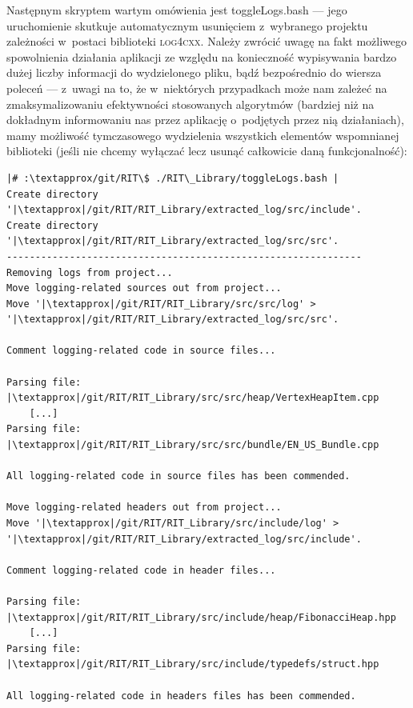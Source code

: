 Następnym skryptem wartym omówienia jest \textsf{toggleLogs.bash} --- jego uruchomienie skutkuje automatycznym usunięciem z~wybranego projektu zależności w~postaci biblioteki \textsc{log4cxx}. Należy zwrócić uwagę na fakt możliwego spowolnienia działania aplikacji ze względu na konieczność wypisywania bardzo dużej liczby informacji do wydzielonego pliku, bądź bezpośrednio do wiersza poleceń --- z~uwagi na to, że w~niektórych przypadkach może nam zależeć na zmaksymalizowaniu efektywności stosowanych algorytmów (bardziej niż na dokładnym informowaniu nas przez aplikację o~podjętych przez nią działaniach), mamy możliwość tymczasowego wydzielenia wszystkich elementów wspomnianej biblioteki (jeśli nie chcemy wyłączać lecz usunąć całkowicie daną funkcjonalność):

\begin{verbatim}
|# :\textapprox/git/RIT\$ ./RIT\_Library/toggleLogs.bash |
Create directory '|\textapprox|/git/RIT/RIT_Library/extracted_log/src/include'.
Create directory '|\textapprox|/git/RIT/RIT_Library/extracted_log/src/src'.
--------------------------------------------------------------
Removing logs from project...
Move logging-related sources out from project...
Move '|\textapprox|/git/RIT/RIT_Library/src/src/log' > '|\textapprox|/git/RIT/RIT_Library/extracted_log/src/src'.

Comment logging-related code in source files...

Parsing file: |\textapprox|/git/RIT/RIT_Library/src/src/heap/VertexHeapItem.cpp
	[...]
Parsing file: |\textapprox|/git/RIT/RIT_Library/src/src/bundle/EN_US_Bundle.cpp

All logging-related code in source files has been commended.

Move logging-related headers out from project...
Move '|\textapprox|/git/RIT/RIT_Library/src/include/log' > '|\textapprox|/git/RIT/RIT_Library/extracted_log/src/include'.

Comment logging-related code in header files...

Parsing file: |\textapprox|/git/RIT/RIT_Library/src/include/heap/FibonacciHeap.hpp
	[...]
Parsing file: |\textapprox|/git/RIT/RIT_Library/src/include/typedefs/struct.hpp

All logging-related code in headers files has been commended.
\end{verbatim}

